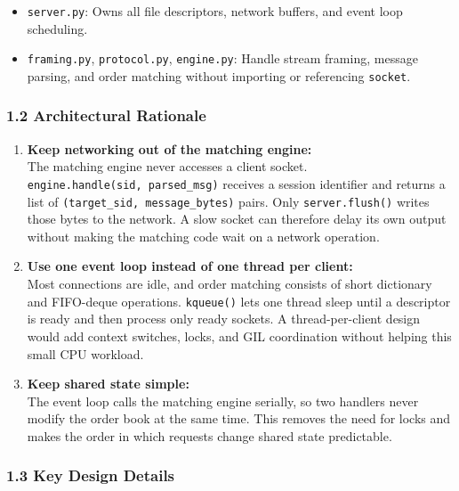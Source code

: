 \documentclass[
]{article}
\providecommand{\tightlist}{%
  \setlength{\itemsep}{0pt}\setlength{\parskip}{0pt}}
\begin{document}
\begin{itemize}
\tightlist
\item
  \texttt{server.py}: Owns all file descriptors, network buffers, and
  event loop scheduling.
\item
  \texttt{framing.py}, \texttt{protocol.py}, \texttt{engine.py}: Handle
  stream framing, message parsing, and order matching without importing
  or referencing \texttt{socket}.
\end{itemize}

\hypertarget{architectural-rationale}{%
\subsubsection{1.2 Architectural
Rationale}\label{architectural-rationale}}

\begin{enumerate}
\def\labelenumi{\arabic{enumi}.}
\tightlist
\item
  \textbf{Keep networking out of the matching engine:}\\
  The matching engine never accesses a client socket.
  \texttt{engine.handle(sid,\ parsed\_msg)} receives a session identifier
  and returns a list of \texttt{(target\_sid,\ message\_bytes)} pairs.
  Only \texttt{server.flush()} writes those bytes to the network. A slow
  socket can therefore delay its own output without making the matching
  code wait on a network operation.
\item
  \textbf{Use one event loop instead of one thread per client:}\\
  Most connections are idle, and order matching consists of short
  dictionary and FIFO-deque operations. \texttt{kqueue()} lets one thread
  sleep until a descriptor is ready and then process only ready sockets.
  A thread-per-client design would add context switches, locks, and GIL
  coordination without helping this small CPU workload.
\item
  \textbf{Keep shared state simple:}\\
  The event loop calls the matching engine serially, so two handlers never
  modify the order book at the same time. This removes the need for locks
  and makes the order in which requests change shared state predictable.
\end{enumerate}

\hypertarget{key-design-details}{%
\subsubsection{1.3 Key Design Details}\label{key-design-details}}
\end{document}
